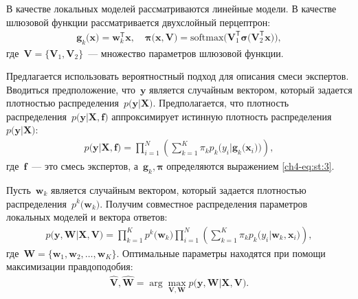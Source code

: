 \documentclass{dissert}
\begin{document}
В качестве локальных моделей рассматриваются линейные модели. В качестве шлюзовой функции рассматривается двухслойный перцептрон:
\[
\label{ch4-eq:st:3}
\begin{aligned}
\mathbf{g}_k\bigr(\textbf{x}\bigr) = \textbf{w}_k^{\mathsf{T}}\textbf{x}, \quad
\bm{\pi}\bigr(\mathbf{x}, \mathbf{V}\bigr) = \text{softmax}\bigr(\mathbf{V}_{1}^{\mathsf{T}}\bm{\sigma}\bigr(\mathbf{V}_2^{\mathsf{T}}\mathbf{x}\bigr)\bigr),
\end{aligned}
\]
где~$\mathbf{V} = \bigr\{\mathbf{V}_1, \mathbf{V}_2\bigr\}$~--- множество параметров шлюзовой функции.

Предлагается использовать вероятностный подход для описания смеси экспертов. Вводиться предположение, что~$\textbf{y}$ является случайным вектором, который задается плотностью распределения~$p\bigr(\textbf{y}|\textbf{X}\bigr)$. Предполагается, что плотность распределения~$p\bigr(\textbf{y}|\textbf{X}, \textbf{f}\bigr)$ аппроксимирует истинную плотность распределения~$p\bigr(\textbf{y}|\textbf{X}\bigr)$:
\[
\label{ch4-eq:st:new:1}
\begin{aligned}
p\bigr(\textbf{y}|\textbf{X}, \textbf{f}\bigr) = \prod_{i=1}^{N}\left(\sum_{k=1}^{K}\pi_kp_{k}\bigr(y_{i}|\textbf{g}_{k}\bigr(\mathbf{x}_{i}\bigr)\bigr)\right),
\end{aligned}
\]
где~$\textbf{f}$~--- это смесь экспертов, а~$\textbf{g}_k, \bm{\pi}$ определяются выражением \eqref{ch4-eq:st:3}.

Пусть~$\textbf{w}_k$ является случайным вектором, который задается плотностью распределения~$p^{k}\bigr(\mathbf{w}_k\bigr)$. Получим совместное распределения параметров локальных моделей и вектора ответов:
\[
\label{ch4-eq:st:4}
\begin{aligned}
p\bigr(\mathbf{y}, \mathbf{W}|\mathbf{X}, \mathbf{V}\bigr) = \prod_{k=1}^{K}p^{k}\bigr(\mathbf{w}_k\bigr)\prod_{i=1}^{N}\left(\sum_{k=1}^{K}\pi_{k}p_{k}\bigr(y_i|\mathbf{w}_k, \mathbf{x}_i\bigr)\right),
\end{aligned}
\]
где~$\mathbf{W} = \bigr\{\mathbf{w}_1, \mathbf{w}_2, \ldots, \mathbf{w}_K\bigr\}.$
Оптимальные параметры находятся при помощи максимизации правдоподобия:
\[
\label{ch4-eq:st:5}
\begin{aligned}
\hat{\mathbf{V}}, \hat{ \mathbf{W}} = \arg\max_{\mathbf{V}, \mathbf{W}} p\bigr(\mathbf{y},  \mathbf{W}|\mathbf{X}, \mathbf{V}\bigr).
\end{aligned}
\]
\end{document}
